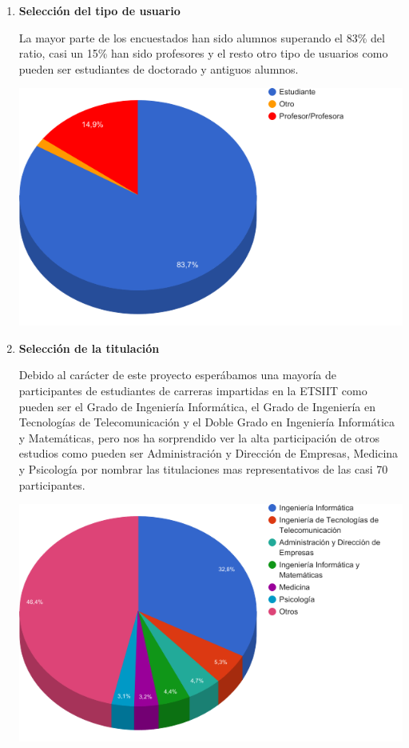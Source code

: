 \begin{enumerate}

  \item \textbf{Selección del tipo de usuario}

  La mayor parte de los encuestados han sido alumnos superando el 83\% del ratio, casi un 15\% han sido profesores y el resto otro tipo de usuarios como pueden  ser estudiantes de doctorado y antiguos alumnos.


	\includegraphics[width=1.0\textwidth]{../charts/01_esusted}


  \item \textbf{Selección de la titulación}

  Debido al carácter de este proyecto esperábamos una mayoría de participantes de estudiantes de carreras impartidas en la ETSIIT como pueden ser el Grado de Ingeniería Informática, el Grado de Ingeniería en Tecnologías de Telecomunicación y el Doble Grado en Ingeniería Informática y Matemáticas, pero nos ha sorprendido ver la alta participación de otros estudios como pueden ser Administración y Dirección de Empresas, Medicina y Psicología por nombrar las titulaciones mas representativos de las casi 70 participantes.

  \includegraphics[width=1.0\textwidth]{../charts/02_titulacion}



\end{enumerate}
